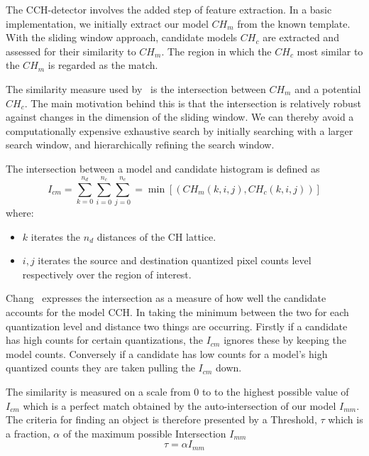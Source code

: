 The CCH-detector involves the added step of feature extraction. In a basic
implementation, we initially extract our model $CH_m$ from the known template.
With the sliding window approach, candidate models $CH_c$ are extracted and
assessed for their similarity to $CH_m$. The region in which the $CH_c$ most
similar to the $CH_m$ is regarded as the match. 

The similarity measure used by~\cite{Chang1999} is the 
intersection between $CH_m$ and a potential $CH_c$. The main motivation behind
this is that the intersection is relatively robust against changes in the
dimension of the sliding window.
We can thereby avoid a computationally expensive exhaustive search by initially
searching with a larger search window, and hierarchically refining the search
window.

The intersection between a model and candidate histogram is defined as
\begin{equation}\label{eqn:intersection}
    I_{cm} = \sum_{k=0}^{n_d}\sum_{i=0}^{n_c}\sum_{j=0}^{n_c} = \min[(CH_m(k,i,j),CH_c(k,i,j))]
\end{equation}
where:
\begin{itemize}
    \item $k$ iterates the $n_d$ distances of the CH lattice.
    \item $i,j$ iterates the source and destination quantized pixel counts level respectively over the
        region of interest.
\end{itemize}

Chang~\cite{Chang1999} expresses the intersection as a measure of how well the
candidate accounts for the model CCH\@. In taking the minimum between the two
for each quantization level and distance two things are occurring. Firstly if a
candidate has high counts for certain quantizations, the $I_{cm}$ ignores these
by keeping the model counts. Conversely if a candidate has low counts for a
model's high quantized counts they are taken pulling the $I_{cm}$ down.

The similarity is measured on a scale from 0 to to the highest possible value of
$I_{cm}$ which is a perfect match obtained by the auto-intersection of our
model $I_{mm}$.
The criteria for finding an object is therefore presented by a Threshold, $\tau$ which
is a fraction, $\alpha$ of the maximum possible Intersection $I_{mm}$
\[\tau=\alpha I_{mm}\]

